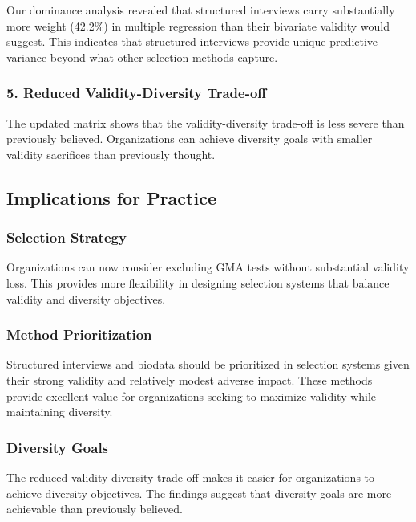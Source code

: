 \documentclass[
]{article}
\begin{document}
Our dominance analysis revealed that structured interviews carry
substantially more weight (42.2\%) in multiple regression than their
bivariate validity would suggest. This indicates that structured
interviews provide unique predictive variance beyond what other
selection methods capture.

\subsubsection{5. Reduced Validity-Diversity
Trade-off}\label{reduced-validity-diversity-trade-off}

The updated matrix shows that the validity-diversity trade-off is less
severe than previously believed. Organizations can achieve diversity
goals with smaller validity sacrifices than previously thought.

\subsection{Implications for
Practice}\label{implications-for-practice-1}

\subsubsection{Selection Strategy}\label{selection-strategy}

Organizations can now consider excluding GMA tests without substantial
validity loss. This provides more flexibility in designing selection
systems that balance validity and diversity objectives.

\subsubsection{Method Prioritization}\label{method-prioritization}

Structured interviews and biodata should be prioritized in selection
systems given their strong validity and relatively modest adverse
impact. These methods provide excellent value for organizations seeking
to maximize validity while maintaining diversity.

\subsubsection{Diversity Goals}\label{diversity-goals}

The reduced validity-diversity trade-off makes it easier for
organizations to achieve diversity objectives. The findings suggest that
diversity goals are more achievable than previously believed.
\end{document}
